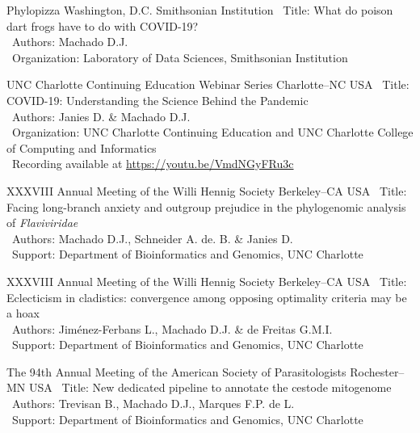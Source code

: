 \documentclass[11pt, letterpaper, sans]{moderncv}
\begin{document}
\cventry{---}
	{Phylopizza}
	{Washington, D.C.}
	{Smithsonian Institution}
	{}
	{
		\textbullet~Title: What do poison dart frogs have to do with COVID-19?\\
		\textbullet~Authors: Machado D.J.\\
		\textbullet~Organization: Laboratory of Data Sciences, Smithsonian Institution\\
	}

\cventry{---}
	{UNC Charlotte Continuing Education Webinar Series}
	{Charlotte--NC}
	{USA}
	{}
	{
		\textbullet~Title: COVID-19: Understanding the Science Behind the Pandemic\\
		\textbullet~Authors: Janies D. \& Machado D.J.\\
		\textbullet~Organization: UNC Charlotte Continuing Education and UNC Charlotte College of Computing and Informatics\\
		\textbullet~Recording available at \url{https://youtu.be/VmdNGyFRu3c}
	}

	{XXXVIII Annual Meeting of the Willi Hennig Society}
	{Berkeley--CA}
	{USA}
	{}
	{
		\textbullet~Title: Facing long-branch anxiety and outgroup prejudice in the phylogenomic analysis of \emph{Flaviviridae}\\
		\textbullet~Authors: Machado D.J., Schneider A. de. B. \& Janies D.\\
		\textbullet~Support: Department of Bioinformatics and Genomics,  UNC Charlotte
	}

\vspace{.5em}

\cventry{---}
	{XXXVIII Annual Meeting of the Willi Hennig Society}
	{Berkeley--CA}
	{USA}
	{}
	{
		\textbullet~Title: Eclecticism in cladistics: convergence among opposing optimality criteria may be a hoax\\
		\textbullet~Authors: Jiménez-Ferbans L., Machado D.J. \& de Freitas G.M.I.\\ \textbullet~Support: Department of Bioinformatics and Genomics,  UNC Charlotte
	}

\vspace{.5em}

\cventry{---}
	{The 94th Annual Meeting of the American Society of Parasitologists}
	{Rochester--MN}
	{USA}
	{}
	{
		\textbullet~Title:  New dedicated pipeline to annotate the cestode mitogenome\\
		\textbullet~Authors: Trevisan B., Machado D.J., Marques F.P. de L.\\ \textbullet~Support: Department of Bioinformatics and Genomics,  UNC Charlotte
	}
\end{document}
